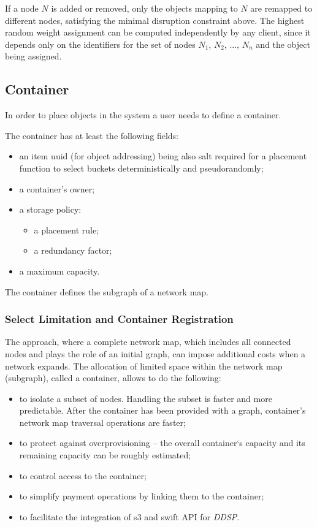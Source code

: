 \documentclass[a4paper, 11pt]{article}
\begin{document}
If a node $N$ is added or removed, only the objects mapping to $N$ are remapped to
different nodes, satisfying the minimal disruption constraint above. The highest random weight
assignment can be computed independently by any client, since it depends only on
the identifiers for the set of nodes $N_1$, $N_2$, ..., $N_n$ and the object
being assigned.

\subsection{Container}
In order to place objects in the system a user needs to define a container.

The container has at least the following fields:
\begin{itemize}%
\item an item uuid (for object addressing) being also salt required for a placement function to select buckets deterministically and pseudorandomly;
\item a container's owner;
\item a storage policy:
\begin{itemize}[noitemsep]
  \item a placement rule;
  \item a redundancy factor;\end{itemize}
\item a maximum capacity.
\end{itemize}The container defines the subgraph of a network map.

\subsubsection{Select Limitation and Container Registration}
The approach, where a complete network map, which includes all connected
nodes and plays the role of an initial graph, can impose additional costs when a
network expands. The allocation of limited space within the network map
(subgraph), called a container, allows to do the following:

\begin{itemize}%
\item to isolate a subset of nodes. Handling the subset is faster and more
  predictable. After the container has been provided with a graph, container's
  network map traversal operations are faster;
\item to protect against overprovisioning -- the
  overall container`s capacity and its remaining capacity can be roughly estimated;
\item to control access to the container;
\item to simplify payment operations by linking them to the container;
\item to facilitate the integration of s3 and swift API for \textit{DDSP}.
\end{itemize}
\end{document}
